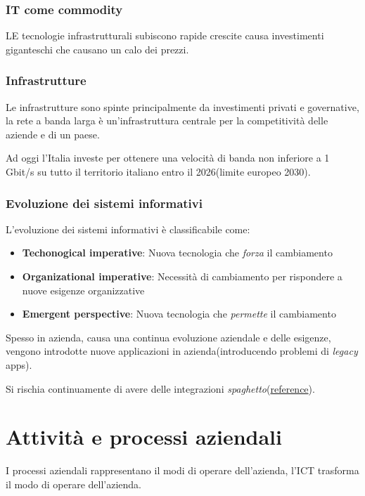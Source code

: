 


\subsection{IT come commodity}
LE tecnologie infrastrutturali subiscono rapide crescite causa investimenti giganteschi
che causano un calo dei prezzi.

\subsection{Infrastrutture}
Le infrastrutture sono spinte principalmente da investimenti privati e governative,
la rete a banda larga è un'infrastruttura centrale per la competitività delle aziende e 
di un paese.

Ad oggi l'Italia investe per ottenere una velocità di banda non inferiore a 1 Gbit/s su
tutto il territorio italiano entro il 2026(limite europeo 2030).



\subsection{Evoluzione dei sistemi informativi}

L'evoluzione dei sistemi informativi è classificabile come:
\begin{itemize}
  \item \textbf{Techonogical imperative}: Nuova tecnologia che \textit{forza} il cambiamento
  \item \textbf{Organizational imperative}: Necessità di cambiamento per rispondere a nuove esigenze organizzative
  \item \textbf{Emergent perspective}: Nuova tecnologia che \textit{permette} il cambiamento
\end{itemize}


Spesso in azienda, causa una continua evoluzione aziendale e delle esigenze,
vengono introdotte nuove applicazioni in azienda(introducendo problemi di \textit{legacy} apps).

Si rischia continuamente di avere delle integrazioni \textit{spaghetto}(\href{https://en.wikipedia.org/wiki/Spaghetti_code}{reference}).

\chapter{Attività e processi aziendali}
I processi aziendali rappresentano il modi di operare dell'azienda, l'ICT trasforma il modo
di operare dell'azienda.

